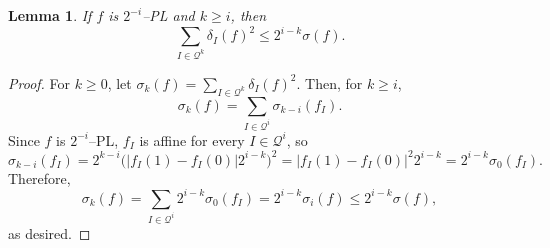 \documentclass[12pt,reqno]{amsart}
\newcommand{\cQ}{\mathcal{Q}}
\newtheorem{lemma}[thm]{Lemma}
\theoremstyle{remark}
\newcommand{\0}{\mathbf{0}}
\renewcommand{\1}{\mathbf 1}
\begin{document}
\begin{lemma}\label{lem:PL-sigma}
  If $f$ is $2^{-i}$--PL and $k\ge i$, then
  $$\sum_{I\in \cQ^{k}} \delta_I(f)^2 \le 2^{i-k} \sigma(f).$$
\end{lemma}
\begin{proof}
  For $k\ge 0$, let $\sigma_k(f) = \sum_{I\in \cQ^{k}} \delta_I(f)^2$. Then, for $k \ge i$,
  $$\sigma_k(f) = \sum_{I\in \cQ^i} \sigma_{k-i}(f_{I}).$$
  Since $f$ is $2^{-i}$--PL, $f_{I}$ is affine for every $I\in \cQ^i$, so
  $$
  \sigma_{k-i}(f_{I}) = 2^{k-i} \big(|f_{I}(1)-f_{I}(0)|2^{i-k}\big)^2 = |f_{I}(1)-f_{I}(0)|^2 2^{i-k} = 2^{i-k} \sigma_{0}(f_{I}).
  $$
  Therefore,
  $$\sigma_k(f) = \sum_{I\in\cQ^i} 2^{i-k} \sigma_{0}(f_{I}) = 2^{i-k}\sigma_i(f) \le 2^{i-k}\sigma(f),$$
  as desired.
\end{proof}
\end{document}
